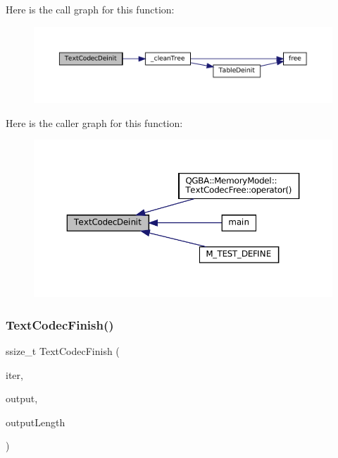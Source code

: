 Here is the call graph for this function\+:
\nopagebreak
\begin{figure}[H]
\begin{center}
\leavevmode
\includegraphics[width=350pt]{text-codec_8c_afbd19db66f87e92647579c2b63c941cc_cgraph}
\end{center}
\end{figure}
Here is the caller graph for this function\+:
\nopagebreak
\begin{figure}[H]
\begin{center}
\leavevmode
\includegraphics[width=350pt]{text-codec_8c_afbd19db66f87e92647579c2b63c941cc_icgraph}
\end{center}
\end{figure}
\mbox{\label{text-codec_8c_a9aeee69d7c95b369f219d0f5eb65a075}} 
\subsubsection{\texorpdfstring{Text\+Codec\+Finish()}{TextCodecFinish()}}
{\footnotesize\ttfamily ssize\+\_\+t Text\+Codec\+Finish (\begin{DoxyParamCaption}\item[{struct Text\+Codec\+Iterator $\ast$}]{iter,  }\item[{uint8\+\_\+t $\ast$}]{output,  }\item[{size\+\_\+t}]{output\+Length }\end{DoxyParamCaption})}

